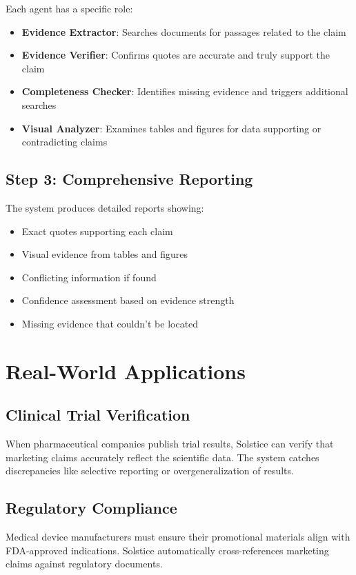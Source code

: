 \documentclass[11pt]{article}
\begin{document}
Each agent has a specific role:
\begin{itemize}
\item \textbf{Evidence Extractor}: Searches documents for passages related to the claim
\item \textbf{Evidence Verifier}: Confirms quotes are accurate and truly support the claim
\item \textbf{Completeness Checker}: Identifies missing evidence and triggers additional searches
\item \textbf{Visual Analyzer}: Examines tables and figures for data supporting or contradicting claims
\end{itemize}

\subsection{Step 3: Comprehensive Reporting}

The system produces detailed reports showing:
\begin{itemize}
\item Exact quotes supporting each claim
\item Visual evidence from tables and figures
\item Conflicting information if found
\item Confidence assessment based on evidence strength
\item Missing evidence that couldn't be located
\end{itemize}

\section{Real-World Applications}

\subsection{Clinical Trial Verification}
When pharmaceutical companies publish trial results, Solstice can verify that marketing claims accurately reflect the scientific data. The system catches discrepancies like selective reporting or overgeneralization of results.

\subsection{Regulatory Compliance}
Medical device manufacturers must ensure their promotional materials align with FDA-approved indications. Solstice automatically cross-references marketing claims against regulatory documents.
\end{document}
